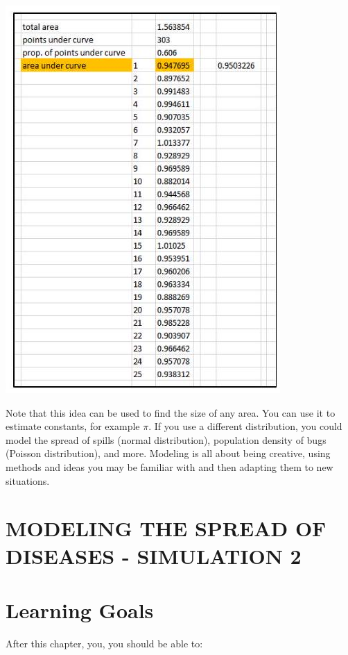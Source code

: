 \documentclass[10pt]{article}
\begin{document}
\includegraphics[max width=\textwidth]{2022_07_05_5945264bba2a5f6ba667g-21}

Note that this idea can be used to find the size of any area. You can use it to estimate constants, for example $\pi$. If you use a different distribution, you could model the spread of spills (normal distribution), population density of bugs (Poisson distribution), and more. Modeling is all about being creative, using methods and ideas you may be familiar with and then adapting them to new situations.

\section{MODELING THE SPREAD OF DISEASES - SIMULATION 2}
\section{Learning Goals}
After this chapter, you, you should be able to:
\end{document}
